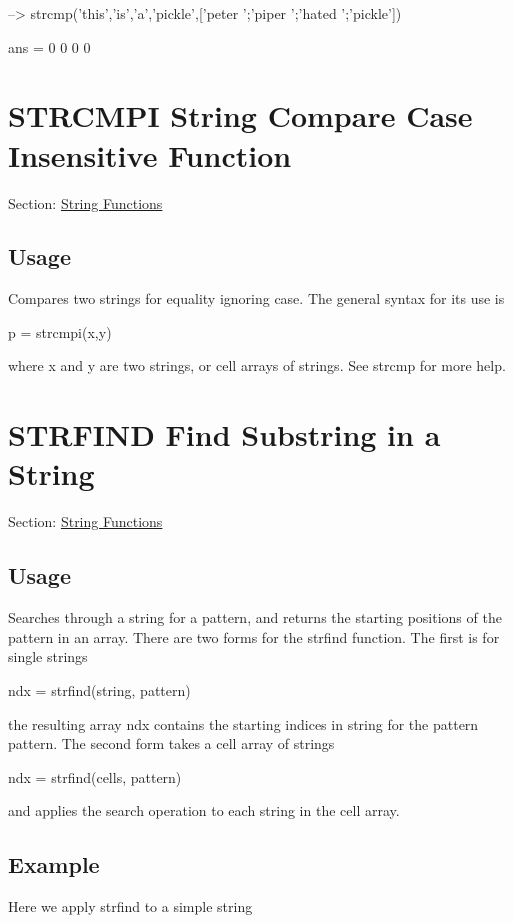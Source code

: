\begin{DoxyVerbInclude}
--> strcmp({'this','is','a','pickle'},['peter ';'piper ';'hated ';'pickle'])

ans = 
 0 0 0 0 
\end{DoxyVerbInclude}
 \hypertarget{string_strcmpi}{}\section{S\-T\-R\-C\-M\-P\-I String Compare Case Insensitive Function}\label{string_strcmpi}
Section\-: \hyperlink{sec_string}{String Functions} \hypertarget{vtkwidgets_vtkxyplotwidget_Usage}{}\subsection{Usage}\label{vtkwidgets_vtkxyplotwidget_Usage}
Compares two strings for equality ignoring case. The general syntax for its use is \begin{DoxyVerb}   p = strcmpi(x,y)
\end{DoxyVerb}
 where {\ttfamily x} and {\ttfamily y} are two strings, or cell arrays of strings. See {\ttfamily strcmp} for more help. \hypertarget{string_strfind}{}\section{S\-T\-R\-F\-I\-N\-D Find Substring in a String}\label{string_strfind}
Section\-: \hyperlink{sec_string}{String Functions} \hypertarget{vtkwidgets_vtkxyplotwidget_Usage}{}\subsection{Usage}\label{vtkwidgets_vtkxyplotwidget_Usage}
Searches through a string for a pattern, and returns the starting positions of the pattern in an array. There are two forms for the {\ttfamily strfind} function. The first is for single strings \begin{DoxyVerb}   ndx = strfind(string, pattern)
\end{DoxyVerb}
 the resulting array {\ttfamily ndx} contains the starting indices in {\ttfamily string} for the pattern {\ttfamily pattern}. The second form takes a cell array of strings \begin{DoxyVerb}   ndx = strfind(cells, pattern)
\end{DoxyVerb}
 and applies the search operation to each string in the cell array. \hypertarget{variables_struct_Example}{}\subsection{Example}\label{variables_struct_Example}
Here we apply {\ttfamily strfind} to a simple string


